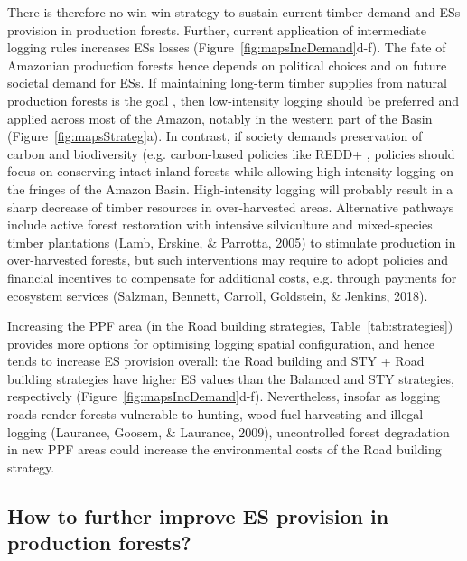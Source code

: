 \documentclass{article}
\begin{document}
There is therefore no win-win strategy to sustain current timber demand and ESs provision in production forests. Further, current application of intermediate logging rules increases ESs losses (Figure~\ref{fig:mapsIncDemand}d-f). The fate of Amazonian production forests hence depends on political choices and on future societal demand for ESs. If maintaining long-term timber supplies from natural production forests is the goal \cite{Zarin2007}, then low-intensity logging should be preferred and applied across most of the Amazon, notably in the western part of the Basin (Figure~\ref{fig:mapsStrateg}a). In contrast, if society demands preservation of carbon and biodiversity (e.g. carbon-based policies like REDD+ \cite{Stickler2009}, policies should focus on conserving intact inland forests while allowing high-intensity logging on the fringes of the Amazon Basin. High-intensity logging will probably result in a sharp decrease of timber resources in over-harvested areas. Alternative pathways include active forest restoration with intensive silviculture and mixed-species timber plantations (Lamb, Erskine, & Parrotta, 2005) to stimulate production in over-harvested forests, but such interventions may require to adopt policies and financial incentives to compensate for additional costs, e.g. through payments for ecosystem services (Salzman, Bennett, Carroll, Goldstein, & Jenkins, 2018).

Increasing the PPF area (in the Road building strategies, Table~\ref{tab:strategies}) provides more options for optimising logging spatial configuration, and hence tends to increase ES provision overall: the Road building  and STY  + Road building strategies have higher ES values than the Balanced and STY strategies, respectively (Figure~\ref{fig:mapsIncDemand}d-f). Nevertheless, insofar as logging roads render forests vulnerable to hunting, wood-fuel harvesting and illegal logging (Laurance, Goosem, & Laurance, 2009), uncontrolled forest degradation in new PPF areas could increase the environmental costs of the Road building strategy.
 
\subsection{How to further improve ES provision in production forests?}
\end{document}

